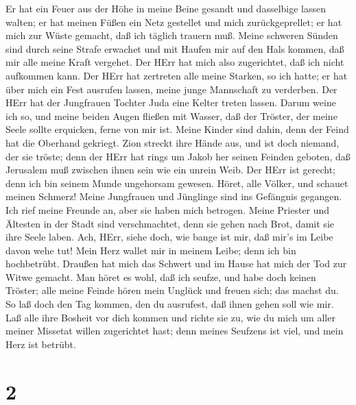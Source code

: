 Er hat ein Feuer aus der Höhe in meine Beine gesandt und dasselbige
lassen walten; er hat meinen Füßen ein Netz gestellet und mich
zurückgeprellet; er hat mich zur Wüste gemacht, daß ich täglich trauern
muß.  Meine schweren Sünden sind durch seine Strafe
erwachet und mit Haufen mir auf den Hals kommen, daß mir alle meine
Kraft vergehet. Der HErr hat mich also zugerichtet, daß ich nicht
aufkommen kann.  Der HErr hat zertreten alle meine Starken,
so ich hatte; er hat über mich ein Fest ausrufen lassen, meine junge
Mannschaft zu verderben. Der HErr hat der Jungfrauen Tochter Juda eine
Kelter treten lassen.  Darum weine ich so, und meine beiden
Augen fließen mit Wasser, daß der Tröster, der meine Seele sollte
erquicken, ferne von mir ist. Meine Kinder sind dahin, denn der Feind
hat die Oberhand gekriegt.  Zion streckt ihre Hände aus,
und ist doch niemand, der sie tröste; denn der HErr hat rings um Jakob
her seinen Feinden geboten, daß Jerusalem muß zwischen ihnen sein wie
ein unrein Weib.  Der HErr ist gerecht; denn ich bin seinem
Munde ungehorsam gewesen. Höret, alle Völker, und schauet meinen
Schmerz! Meine Jungfrauen und Jünglinge sind ins Gefängnis gegangen.
 Ich rief meine Freunde an, aber sie haben mich betrogen.
Meine Priester und Ältesten in der Stadt sind verschmachtet, denn sie
gehen nach Brot, damit sie ihre Seele laben.  Ach, HErr,
siehe doch, wie bange ist mir, daß mir's im Leibe davon wehe tut! Mein
Herz wallet mir in meinem Leibe; denn ich bin hochbetrübt. Draußen hat
mich das Schwert und im Hause hat mich der Tod zur Witwe gemacht.
 Man höret es wohl, daß ich seufze, und habe doch keinen
Tröster; alle meine Feinde hören mein Unglück und freuen sich; das
machst du. So laß doch den Tag kommen, den du ausrufest, daß ihnen gehen
soll wie mir.  Laß alle ihre Bosheit vor dich kommen und
richte sie zu, wie du mich um aller meiner Missetat willen zugerichtet
hast; denn meines Seufzens ist viel, und mein Herz ist betrübt.

\hypertarget{section-1}{%
\section{2}\label{section-1}}

